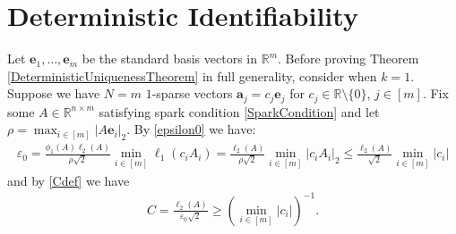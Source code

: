\documentclass[journal, onecolumn]{IEEEtran}
\begin{document}
\section{Deterministic Identifiability}\label{DUT}

Let $\mathbf{e}_1, \ldots, \mathbf{e}_m$ be the standard basis vectors in $\mathbb R^m$.
Before proving Theorem \ref{DeterministicUniquenessTheorem} in full generality, consider when $k=1$. Suppose we have $N = m$ $1$-sparse vectors $\mathbf{a}_j = c_j \mathbf{e}_j$ for $c_j \in \mathbb{R} \setminus \{0\}$, $j \in [m]$. Fix some $A \in \mathbb{R}^{n \times m}$ satisfying spark condition \eqref{SparkCondition} and let $\rho = \max_{i \in [m]} |A\mathbf{e}_i|_2$. By \eqref{epsilon0} we have:
\begin{align}
\varepsilon_0 
= \frac{ \phi_1(A) \ell_{2}(A) }{\rho \sqrt{2}} \min_{i \in [m]} \ell_1(c_iA_i) 
= \frac{\ell_2(A)}{ \rho \sqrt{2}} \min_{i \in [m]}|c_iA_i|_2
\leq \frac{\ell_2(A)}{ \sqrt{2}} \min_{i \in [m]}|c_i|
\end{align}
%
and by \eqref{Cdef} we have
\begin{align}
C = \frac{\ell_{2}(A)}{ \varepsilon_0 \sqrt{2}} \geq (\min_{i \in [m]} |c_i|)^{-1}.
\end{align} 
\end{document}
